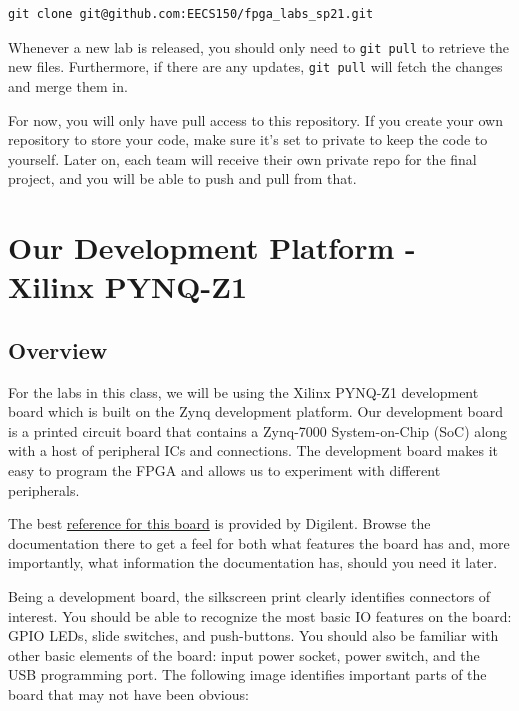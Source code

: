 \documentclass[11pt]{article}
\begin{document}
\begin{verbatim}
git clone git@github.com:EECS150/fpga_labs_sp21.git
\end{verbatim}

Whenever a new lab is released, you should only need to \verb|git pull| to retrieve the new files. Furthermore, if there are any updates, \verb|git pull| will fetch the changes and merge them in.

For now, you will only have pull access to this repository. If you create your own repository to store your code, make sure it's set to private to keep the code to yourself. Later on, each team will receive their own private repo for the final project, and you will be able to push and pull from that.

\section{Our Development Platform - Xilinx PYNQ-Z1}
\label{section:platform}

\subsection{Overview}

For the labs in this class, we will be using the Xilinx PYNQ-Z1 development board which is built on the Zynq development platform. Our development board is a printed circuit board that contains a Zynq-7000 System-on-Chip (SoC) along with a host of peripheral ICs and connections. The development board makes it easy to program the FPGA and allows us to experiment with different peripherals.

The best \href{https://reference.digilentinc.com/reference/programmable-logic/pynq-z1/reference-manual}{reference for this board} is provided by Digilent.
Browse the documentation there to get a feel for both what features the board has and, more importantly, what information the documentation has, should you need it later.

Being a development board, the silkscreen print clearly identifies connectors of interest. You should be able to recognize the most basic IO features on the board: GPIO LEDs, slide switches, and push-buttons. You should also be familiar with other basic elements of the board: input power socket, power switch, and the USB programming port. The following image identifies important parts of the board that may not have been obvious:
\end{document}
